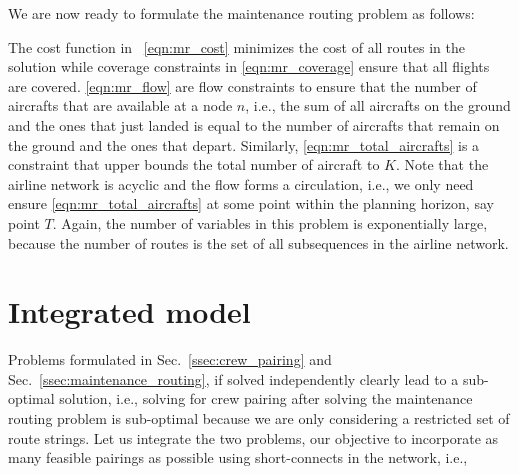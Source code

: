 \documentclass[letterpaper, 10pt, twocolumn, reqno]{amsart}
\begin{document}
We are now ready to formulate the maintenance routing problem as follows:

The cost function in ~\eqref{eqn:mr_cost} minimizes the cost of all routes in the solution while coverage constraints in \eqref{eqn:mr_coverage} ensure that
all flights are covered. \eqref{eqn:mr_flow} are flow constraints to ensure that the number of aircrafts that are available at a node $n$, i.e., the sum of all aircrafts on the ground and the ones that just landed is equal to the
number of aircrafts that remain on the ground and the ones that depart. Similarly, \eqref{eqn:mr_total_aircrafts} is a constraint that upper bounds
the total number of aircraft to $K$. Note that the airline network is acyclic and the flow forms a circulation, i.e., we only need ensure \eqref{eqn:mr_total_aircrafts} at some point within the planning horizon, say point $T$. Again, the number of variables in this problem is exponentially large, because the number of routes is the set of all subsequences in the airline network.

\section{Integrated model}
\label{sec:integrated_model}
Problems formulated in Sec.~\ref{ssec:crew_pairing} and Sec.~\ref{ssec:maintenance_routing}, if solved independently clearly lead to a sub-optimal solution, i.e., solving for crew pairing after solving the maintenance routing problem is sub-optimal because we are only considering a restricted set of route strings. Let us integrate the two problems, our objective to incorporate as many feasible pairings as possible using short-connects in the network, i.e., 
\end{document}

